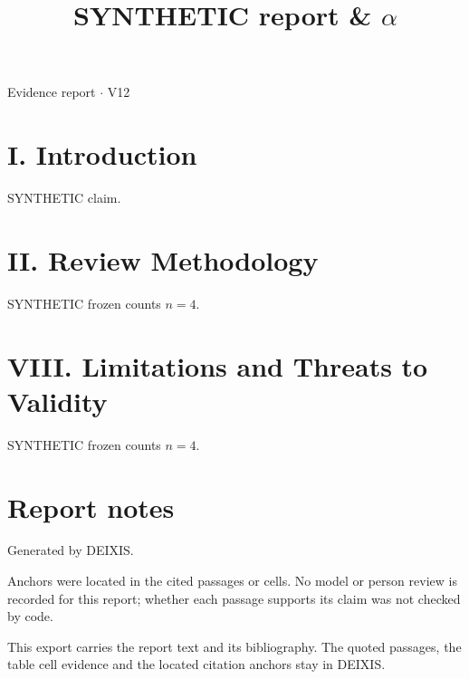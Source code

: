 \documentclass[journal]{IEEEtran}
\begin{document}
\title{SYNTHETIC report \& \ensuremath{\alpha}}

\maketitle

\noindent Evidence report \ensuremath{\cdot} V12

\section*{I. Introduction}

SYNTHETIC claim. \cite{Synth26}

\section*{II. Review Methodology}

SYNTHETIC frozen counts $n=4$.

\section*{VIII. Limitations and Threats to Validity}

SYNTHETIC frozen counts $n=4$.

\section*{Report notes}

Generated by DEIXIS.

Anchors were located in the cited passages or cells. No model or person review is recorded for this report; whether each passage supports its claim was not checked by code.

This export carries the report text and its bibliography. The quoted passages, the table cell evidence and the located citation anchors stay in DEIXIS.




\end{document}
